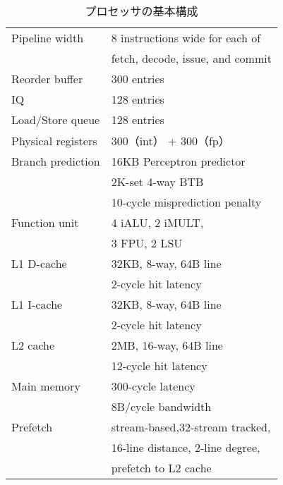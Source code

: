 \begin{table}[htb]
  \caption{プロセッサの基本構成}
  \footnotesize
  \center
    \begin{tabular}{l|l} \hline \hline
     Pipeline width & 8 instructions wide for each of \\
     & fetch, decode, issue, and commit \\
     Reorder buffer & 300 entries \\
     IQ & 128 entries \\
     Load/Store queue & 128 entries \\
     Physical registers & 300（int） + 300（fp） \\
     Branch prediction & 16KB Perceptron predictor~\cite{Jimenez2001} \\
     & 2K-set 4-way BTB \\
     & 10-cycle misprediction penalty \\
     Function unit & 4 iALU, 2 iMULT, \\
     &  3 FPU, 2 LSU \\
     L1 D-cache & 32KB, 8-way, 64B line \\
      & 2-cycle hit latency \\
     L1 I-cache & 32KB, 8-way, 64B line \\
      &  2-cycle hit latency \\
     L2 cache & 2MB, 16-way, 64B line \\
      & 12-cycle hit latency \\  
     Main memory & 300-cycle latency \\
     & 8B/cycle bandwidth \\ 
     Prefetch & stream-based,32-stream tracked,  \\ 
     & 16-line distance, 2-line degree, \\
     & prefetch to L2 cache \\ \hline
  \end{tabular}
  \label{tab:base_config}
\end{table}

